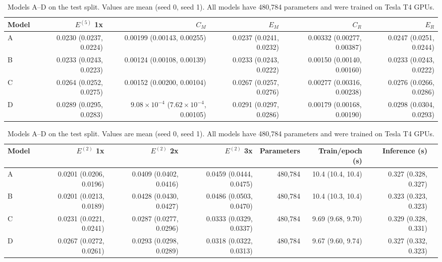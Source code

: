 \documentclass{article}
\newcommand{\Efive}{\ensuremath{E^{(5)}}}
\newcommand{\Etwo}{\ensuremath{E^{(2)}}}
\newcommand{\CM}{\ensuremath{C_M}}
\newcommand{\CR}{\ensuremath{C_R}}
\newcommand{\EM}{\ensuremath{E_M}}
\newcommand{\ER}{\ensuremath{E_R}}
\begin{document}
\begin{table}[H]
\centering
\caption{Models A--D on the test split. Values are mean (seed 0, seed 1). All models have 480,784 parameters and were trained on Tesla T4 GPUs.}
\label{tab:models}
\scriptsize
\begin{adjustbox}{max width=\linewidth}
\begin{tabular}{lrrrrr}
\toprule
Model & \Efive{} 1x & \CM & \EM & \CR & \ER \\
\midrule
A & 0.0230 (0.0237, 0.0224) & 0.00199 (0.00143, 0.00255) & 0.0237 (0.0241, 0.0232) & 0.00332 (0.00277, 0.00387) & 0.0247 (0.0251, 0.0244) \\
B & 0.0233 (0.0243, 0.0223) & 0.00124 (0.00108, 0.00139) & 0.0233 (0.0243, 0.0222) & 0.00150 (0.00140, 0.00160) & 0.0233 (0.0243, 0.0222) \\
C & 0.0264 (0.0252, 0.0275) & 0.00152 (0.00200, 0.00104) & 0.0267 (0.0257, 0.0276) & 0.00277 (0.00316, 0.00238) & 0.0276 (0.0266, 0.0286) \\
D & 0.0289 (0.0295, 0.0283) & $9.08{\times}10^{-4}$ ($7.62{\times}10^{-4}$, 0.00105) & 0.0291 (0.0297, 0.0286) & 0.00179 (0.00168, 0.00190) & 0.0298 (0.0304, 0.0293) \\
\bottomrule
\end{tabular}
\end{adjustbox}

\vspace{5pt}
\begin{adjustbox}{max width=\linewidth}
\begin{tabular}{lrrrrrrr}
\toprule
Model & \Etwo{} 1x & \Etwo{} 2x & \Etwo{} 3x & Parameters & Train/epoch (s) & Inference (s) \\
\midrule
A & 0.0201 (0.0206, 0.0196) & 0.0409 (0.0402, 0.0416) & 0.0459 (0.0444, 0.0475) & 480,784 & 10.4 (10.4, 10.4) & 0.327 (0.328, 0.327) \\
B & 0.0201 (0.0213, 0.0189) & 0.0428 (0.0430, 0.0427) & 0.0486 (0.0503, 0.0470) & 480,784 & 10.4 (10.3, 10.4) & 0.323 (0.323, 0.323) \\
C & 0.0231 (0.0221, 0.0241) & 0.0287 (0.0277, 0.0296) & 0.0333 (0.0329, 0.0337) & 480,784 & 9.69 (9.68, 9.70) & 0.329 (0.328, 0.331) \\
D & 0.0267 (0.0272, 0.0261) & 0.0293 (0.0298, 0.0289) & 0.0318 (0.0322, 0.0313) & 480,784 & 9.67 (9.60, 9.74) & 0.327 (0.332, 0.323) \\
\bottomrule
\end{tabular}
\end{adjustbox}
\end{table}
\end{document}
